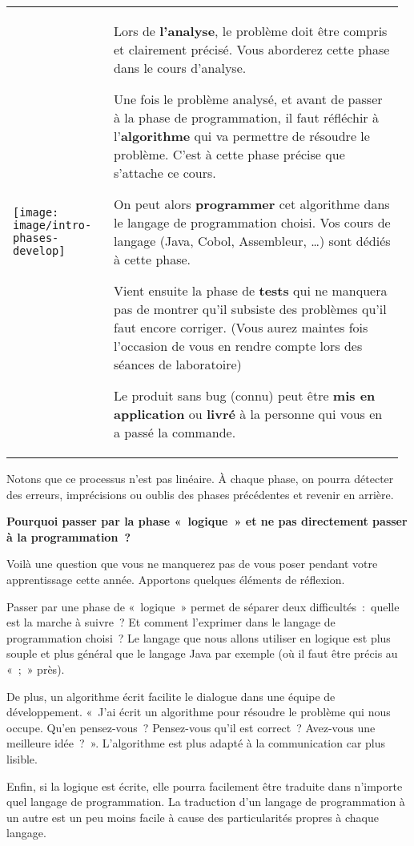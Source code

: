 	\begin{tabular}{m{0.25\linewidth}m{0.72\linewidth}}
	\texttt{[image: image/intro-phases-develop]}
	&
	\begin{liste}
	\item 
		Lors de \textbf{l’analyse}, le problème doit être
		compris et clairement précisé. Vous aborderez cette phase dans le cours
		d’analyse.
	\item
		Une fois le problème analysé, et avant de passer à la phase de
		programmation, il faut réfléchir à l’\textbf{algorithme} qui va
		permettre de résoudre le problème. C’est à cette phase précise
		que s’attache ce cours.
	\item
		On peut alors \textbf{programmer} cet algorithme dans le langage de
		programmation choisi. Vos cours de langage (Java, Cobol, 
		Assembleur, \dots) sont dédiés à cette phase.
	\item
		Vient ensuite la phase de \textbf{tests} qui ne manquera pas de montrer
		qu’il subsiste des problèmes qu’il
		faut encore corriger. (Vous aurez maintes fois
		l’occasion de vous en rendre compte lors des
		séances de laboratoire)
	\item
		Le produit sans bug (connu) peut être \textbf{mis en application}
		ou \textbf{livré} à la personne qui vous en a passé la commande.
	\end{liste}
	\\
	\end{tabular}
	
	Notons que ce processus n’est pas linéaire. À chaque
	phase, on pourra détecter des erreurs, imprécisions ou oublis des
	phases précédentes et revenir en arrière.

	\textbf{Pourquoi passer par la phase «~logique~» 
		et ne pas directement passer à la programmation~?}
	
	Voilà une question que vous ne manquerez pas de vous poser pendant votre
	apprentissage cette année. Apportons quelques éléments de réflexion.

	\begin{liste}
	\item
		Passer par une phase de «~logique~» permet de séparer deux 
		difficultés~:~quelle est la marche à suivre~? Et comment l’exprimer
		dans le langage de programmation choisi~? Le langage que nous allons
		utiliser en logique est plus souple et plus général que le langage Java
		par exemple (où il faut être précis au «~;~» près).
	\item
		De plus, un algorithme écrit facilite le dialogue dans une équipe de
		développement. «~J’ai écrit un algorithme pour
		résoudre le problème qui nous occupe. Qu’en
		pensez-vous~? Pensez-vous qu’il est correct~?
		Avez-vous une meilleure idée~?~». L’algorithme est plus adapté à la
		communication car plus lisible.
	\item
		Enfin, si la logique est écrite, elle pourra facilement être traduite
		dans n’importe quel langage de programmation. La
		traduction d’un langage de programmation à un autre
		est un peu moins facile à cause des particularités propres à chaque
		langage.
	\end{liste}

